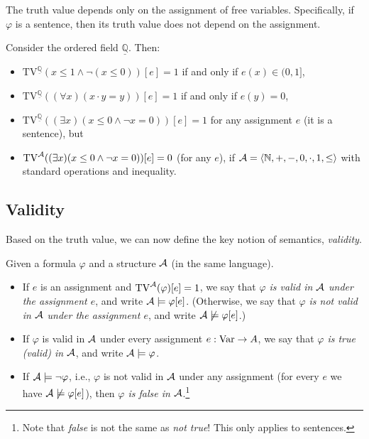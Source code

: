 \begin{remark}
    The truth value depends only on the assignment of free variables. Specifically, if $\varphi$ is a sentence, then its truth value does not depend on the assignment.
\end{remark}

\begin{example}
Consider the ordered field $\underline{\mathbb Q}$. Then:
\begin{itemize}
    \item $\mathrm{TV}^{\underline{\mathbb Q}}(x\leq 1 \land \neg (x\leq 0))[e]=1$ if and only if $e(x)\in (0,1]$,
    \item $\mathrm{TV}^{\underline{\mathbb Q}}((\forall x)(x\cdot y = y))[e]=1$ if and only if $e(y)=0$,
    \item $\mathrm{TV}^{\underline{\mathbb Q}}((\exists x)(x \leq 0 \land \neg x=0))[e]=1$ for any assignment $e$ (it is a sentence), but 
    \item $\mathrm{TV}^{\mathcal{A}}((\exists x)(x \leq 0 \land \neg x=0))[e]=0$ (for any $e$), if $\mathcal{A}=\langle \mathbb N,+,-,0,\cdot,1,\leq\rangle$ with standard operations and inequality.
\end{itemize}    
\end{example}

\subsection{Validity}

Based on the truth value, we can now define the key notion of semantics, \emph{validity}.

\begin{definition}
Given a formula $\varphi$ and a structure $\mathcal{A}$ (in the same language). 
\begin{itemize}
    \item If $e$ is an assignment and $\mathrm{TV}^{\mathcal{A}}(\varphi)[e]=1$, we say that \emph{$\varphi$ is valid in $\mathcal{A}$ under the assignment $e$}, and write $\mathcal{A}\models\varphi[e]$. (Otherwise, we say that \emph{$\varphi$ is not valid in $\mathcal{A}$ under the assignment $e$}, and write $\mathcal{A}\not\models\varphi[e]$.)
    \item If $\varphi$ is valid in $\mathcal{A}$ under every assignment $e:\operatorname{Var}\to A$, we say that \emph{$\varphi$ is true (valid) in $\mathcal{A}$}, and write $\mathcal{A}\models\varphi$.
    \item If $\mathcal{A}\models\neg\varphi$, i.e., $\varphi$ is not valid in $\mathcal{A}$ under any assignment (for every $e$ we have $\mathcal{A}\not\models\varphi[e]$), then \emph{$\varphi$ is false in $\mathcal{A}$}.\footnote{Note that \emph{false} is not the same as \emph{not true}! This only applies to sentences.}
\end{itemize}    
\end{definition}

